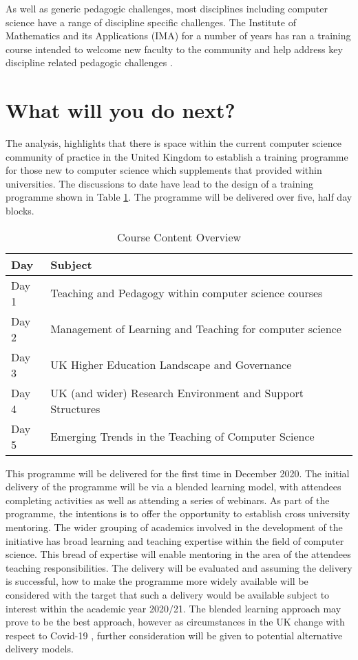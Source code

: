 \documentclass[sigconf]{acmart}
\begin{document}
As well as generic pedagogic challenges, most disciplines including computer science have a range of discipline specific challenges. The Institute of Mathematics and its Applications (IMA) for a number of years has ran a training course intended to welcome new faculty to the community and help address key discipline related pedagogic challenges \cite{IMA}.

\section{What will you do next?}

The analysis, highlights that there is space within the current computer science community of practice in the United Kingdom to establish a training programme for those new to computer science which supplements that provided within universities. The discussions to date have lead to the design of a training programme shown in Table \ref{tab:table1}. The programme will be delivered over five, half day blocks. 

\begin{table}[h]
\begin{tabular}{|p{0.5in}|p{2.5in}|}
\hline
Day   & Subject                                                      \\ \hline
Day 1 & Teaching and Pedagogy within computer science courses        \\ \hline
Day 2 & Management of Learning and Teaching for computer   science   \\ \hline
Day 3 & UK Higher Education Landscape and Governance                 \\ \hline
Day 4 & UK (and wider) Research Environment and Support   Structures \\ \hline
Day 5 & Emerging Trends in the Teaching of Computer Science          \\ \hline
\end{tabular}
\caption{Course Content Overview}
\label{tab:table1}
\end{table}
This programme will be delivered for the first time in December 2020. The initial delivery of the programme will be via a blended learning model, with attendees completing activities as well as attending a series of webinars. As part of the programme, the intentions is to offer the opportunity to establish cross university mentoring. The wider grouping of academics involved in the development of the initiative has broad learning and teaching expertise within the field of computer science. This bread of expertise will enable mentoring in the area of the attendees teaching responsibilities. The delivery will be evaluated and assuming the delivery is successful, how to make the programme more widely available will be considered with the target that such a delivery would be available subject to interest within the academic year 2020/21. The blended learning approach may prove to be the best approach, however as circumstances in the UK change with respect to Covid-19 \cite{Crick20}, further consideration will be given to potential alternative delivery models.
\end{document}
